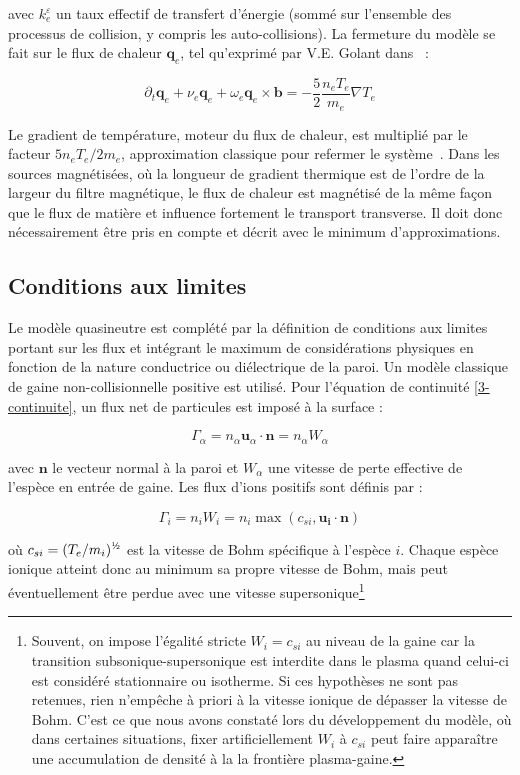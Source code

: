 \begin{refsection}
avec $k_e^\varepsilon$ un taux effectif de transfert d'énergie (sommé sur 
l'ensemble des processus de collision, y compris les auto-collisions).
La fermeture du modèle se fait sur le flux de chaleur $\mathbf{q}_e$, tel qu'exprimé par V.E. Golant
dans~\parencite{Golant} :

\begin{equation}
\label{3-eqFluxChaleur}
\partial_t \mathbf{q}_e + \nu_e\mathbf{q}_e+\omega_e\mathbf{q}_e\times\mathbf{b} =
-\frac{5}{2}\frac{n_eT_e}{m_e}\nabla T_e
\end{equation}

Le gradient de température, moteur du flux de chaleur, est multiplié par le
facteur $5n_eT_e/2m_e$, approximation classique pour refermer le
système~\parencite{bittencourt}.
Dans les sources magnétisées,
où la longueur de gradient thermique est de l'ordre de la largeur
du filtre magnétique, le flux de chaleur est magnétisé de la même façon que le
flux de matière et influence fortement le transport transverse. Il doit donc
nécessairement être pris en compte et décrit avec le minimum d'approximations.

\subsection{Conditions aux limites}
Le modèle quasineutre est complété par la
définition de conditions aux limites portant sur les flux et intégrant le
maximum de considérations physiques en fonction de la nature conductrice ou
diélectrique de la paroi.
Un modèle classique de gaine non-collisionnelle positive est utilisé. Pour
l'équation de continuité \eqref{3-continuite}, un flux net de
particules est imposé à la surface :

\begin{equation}
	\Gamma_\alpha=n_\alpha\mathbf u_\alpha\cdot \mathbf n=n_\alpha W_\alpha
\end{equation} 

avec $\mathbf{n}$ le vecteur normal à la paroi et $W_\alpha$ une vitesse de
perte effective de l'espèce en entrée de gaine. Les flux d'ions positifs sont
définis par :

\begin{equation}
\label{3-fluxIonique}
\Gamma_i=n_iW_i=n_i\max\left(c_{si},\mathbf{u_i}\cdot\mathbf{n}\right)
\end{equation}

où $c_{si}=(T_e/m_i)^{\text{\textonehalf}}$ est la vitesse de Bohm
spécifique à l'espèce $i$.
Chaque espèce ionique atteint donc au minimum sa propre vitesse de Bohm, mais
peut éventuellement être perdue avec une vitesse
supersonique\footnote{Souvent, on impose l'égalité stricte $W_i=c_{si}$ au
niveau de la gaine car la transition subsonique-supersonique est interdite dans
le plasma quand celui-ci est considéré stationnaire ou isotherme. Si ces
hypothèses ne sont pas retenues, rien n'empêche à priori à la vitesse ionique de
dépasser la vitesse de Bohm. C'est ce que nous avons constaté lors du
développement du modèle, où dans certaines situations, fixer artificiellement
$W_i$ à $c_{si}$ peut faire apparaître une accumulation de densité à la la
frontière plasma-gaine.

}
\end{refsection}

